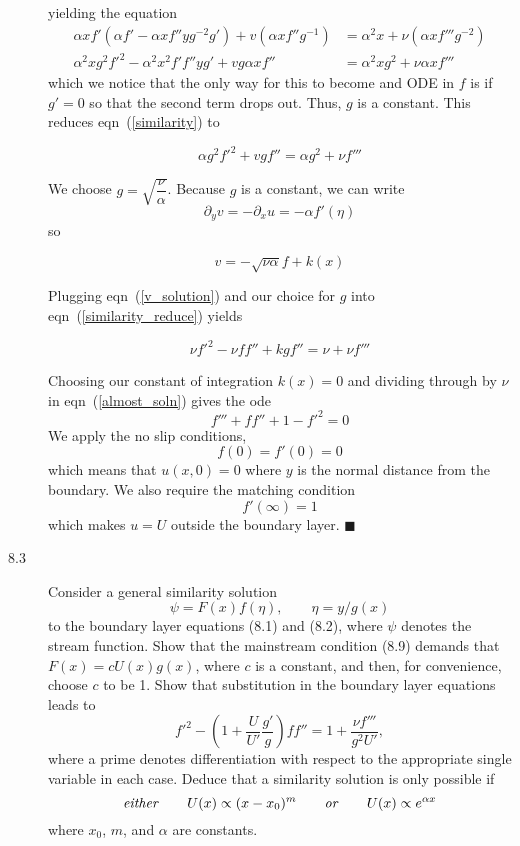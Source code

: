 \documentclass[11pt]{article}
\newcommand{\eqn}[2]{
  \begin{equation}
    \label{#1}
    #2
  \end{equation}
}
\newcommand{\eqr}[1]{eqn~(\ref{#1})}
\newcommand{\p}[1]{\partial_{#1}}
\begin{document}
\begin{description}
$$$$
yielding the equation
\begin{align}
\label{similarity}
\nonumber
  \alpha x f'
  \left(\alpha f' - \alpha x f''yg^{-2}g'\right)
  + v\left(\alpha x f'' g^{-1} \right)
  &=
  \alpha^2 x
  + \nu \left(\alpha x f''' g^{-2} \right)
  \\
%
%
  \alpha^2 x g^2 f'^2
  - \alpha^2 x^2 f'f''yg'
  + vg \alpha x f''
  &=
  \alpha^2 x g^2
  + \nu \alpha x f'''
\end{align}
which we notice that the only way for this to become and ODE in $f$ is if
$g' = 0$ so that the second term drops out. Thus, $g$ is a constant. This reduces
\eqr{similarity} to
\eqn{similarity_reduce}{
  \alpha g^2 f'^2
  + vg f''
  =
  \alpha g^2
  + \nu f'''
}
We choose $g = \sqrt{\dfrac{\nu}{\alpha}}$. Because $g$ is a constant, we can
write
$$
  \p{y}v = -\p{x}u = -\alpha f'(\eta)
$$
so
\eqn{v_solution}{
  v = -\sqrt{\nu\alpha}f + k(x)
}
Plugging \eqr{v_solution} and our choice for $g$ into \eqr{similarity_reduce} yields
\eqn{almost_soln}{
  \nu f'^2
  - \nu f f''
  + k gf''
  =
  \nu
  + \nu f'''
}
Choosing our constant of integration $k(x) = 0$ and dividing through by $\nu$
in \eqr{almost_soln} gives the ode
$$
  f''' + ff'' + 1 - f'^2 = 0
$$
We apply the no slip conditions,
$$
  f(0) = f'(0) = 0
$$
which means that $u(x, 0) = 0$ where $y$ is the normal distance from the boundary.
We also require the matching condition
$$
  f'(\infty) = 1
$$
which makes $u = U$ outside the boundary layer.
%
\hfill $\blacksquare$
\item[8.3] Consider a general similarity solution
$$
  \psi = F(x)f(\eta),
  \qquad
  \eta = y / g(x)
$$
to the boundary layer equations (8.1) and (8.2), where $\psi$ denotes the stream
function. Show that the mainstream condition (8.9) demands that
$F(x) = cU(x)g(x)$, where $c$ is a constant, and then, for convenience, choose
$c$ to be 1. Show that substitution in the boundary layer equations leads to
$$
  f'^2
  - \left(1 + \frac{U}{U'}\frac{g'}{g}\right)ff''
  =
  1 
  + \frac{\nu f'''}{g^2 U'}
  ,
$$
where a prime denotes differentiation with respect to the appropriate single 
variable in each case. Deduce that a similarity solution is only possible if
$$
  \text{\emph{either}}
  \qquad
  U(x) \propto (x - x_0)^m
  \qquad
  \text{\emph{or}}
  \qquad
  U(x) \propto e^{\alpha x}
$$
where $x_0$, $m$, and $\alpha$ are constants.


\end{description}
\end{document}
